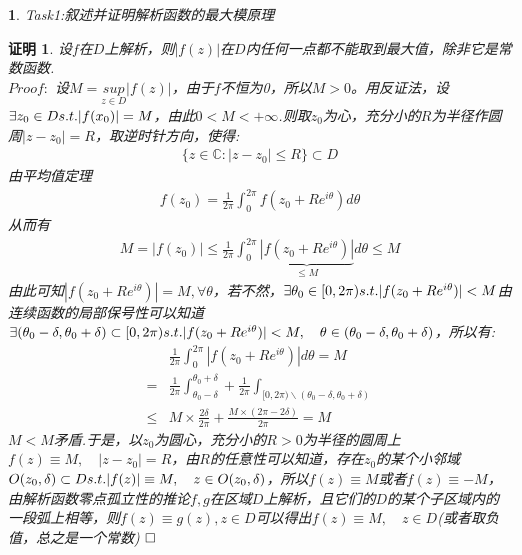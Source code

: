 \documentclass{ctexart}
\newcommand{\。}{．} %
\newenvironment{lanse}{
    \begin{tcolorbox}[breakable,enhanced, colback=qlan, boxrule=0pt, frame hidden,
        borderline west={0.7mm}{0.1mm}{slan}]
    }
    {\end{tcolorbox}}
\newenvironment{huangse}{
    \begin{tcolorbox}[breakable,enhanced, colback=qhuang, boxrule=0pt, frame hidden,
        borderline west={0.7mm}{0.1mm}{shuang}]
    }
    {\end{tcolorbox}}
\newenvironment{zise}{
    \begin{tcolorbox}[breakable,enhanced, colback=qzi, boxrule=0pt, frame hidden,
        borderline west={0.7mm}{0.1mm}{szi}]
    }
    {\end{tcolorbox}}
\theoremstyle{t} %
\newtheorem{dlhj}{\color{shuang} 定理}[subsection]
\newtheorem{lthj}{\color{szi} }
\newtheorem*{zmhj}{\color{slan} 证明}
\newtheorem*{smhj}{\color{slan} }
\newenvironment{zm}{\begin{lanse}\begin{zmhj}}{$\hfill \square$\end{zmhj}\end{lanse}}
\newenvironment{dl}{\begin{huangse}\begin{dlhj}}{\end{dlhj}\end{huangse}}
\newenvironment{lt}{\begin{zise}\begin{lthj}}{\end{lthj}\end{zise}}
\newenvironment{sm}{\begin{zise}\begin{smhj}}{\end{smhj}\end{zise}}
\begin{document}

\begin{sm}
    Task1:叙述并证明解析函数的最大模原理
\end{sm}
\begin{zm}
设$f$在$D$上解析，则$|f(z)|$在$D$内任何一点都不能取到最大值，除非它是常数函数.\\
$Proof:$ 设$M=\underset{z\in D}{sup}|f(z)|$，由于$f$不恒为0，所以$M>0$。用反证法，设$\exists z_0\in D\space s.t. \space |f(x_0)|=M$，由此$0<M<+\infty$.则取$z_0$为心，充分小的$R$为半径作圆周$|z-z_0|=R$，取逆时针方向，使得:
\begin{align*}
    \{z\in \mathbb{C}:|z-z_0|\le R\}\subset D
\end{align*}
由平均值定理
\begin{align*}
    f(z_0)=\frac{1}{2\pi}\int_{0}^{2\pi}f(z_0+Re^{i\theta})d\theta
\end{align*}
从而有
\begin{align*}
    M=|f(z_0)|\le \frac{1}{2\pi}\int_{0}^{2\pi}\underbrace{|f(z_0+Re^{i\theta})|}_{\le M}d\theta\le M
\end{align*}
由此可知$|f(z_0+Re^{i\theta})|=M,\forall \theta$，若不然，$\exists \theta_0\in[0,2\pi)\space s.t.\space |f(z_0+Re^{i\theta})|< M$由连续函数的局部保号性可以知道$\exists (\theta_0-\delta,\theta_0+\delta)\subset [0,2\pi)\space s.t.\space |f(z_0+Re^{i\theta})|<M,\quad \theta\in(\theta_0-\delta,\theta_0+\delta)$，所以有:
\begin{align*}
    &\frac{1}{2\pi}\int_{0}^{2\pi}|f(z_0+Re^{i\theta})|d\theta=M\\
    =&\frac{1}{2\pi}\int_{\theta_0-\delta}^{\theta_0+\delta}+\frac{1}{2\pi}\int_{[0,2\pi)\backslash (\theta_0-\delta,\theta_0+\delta)}\\
    \le& M\times \frac{2\delta}{2\pi}+\frac{M\times (2\pi-2\delta)}{2\pi}=M
\end{align*}
$M<M$矛盾.于是，以$z_0$为圆心，充分小的$R>0$为半径的圆周上$f(z)\equiv M,\quad |z-z_0|=R$，由$R$的任意性可以知道，存在$z_0$的某个小邻域$O(z_0,\delta)\subset D\space s.t. \space |f(z)|\equiv M,\quad z\in O(z_0,\delta)$，所以$f(z)\equiv M$或者$f(z)\equiv -M$，由解析函数零点孤立性的推论$f,g$在区域$D$上解析，且它们的$D$的某个子区域内的一段弧上相等，则$f(z)\equiv g(z),z\in D$可以得出$f(z)\equiv M,\quad z\in D$(或者取负值，总之是一个常数)
\end{zm}
\end{document}
